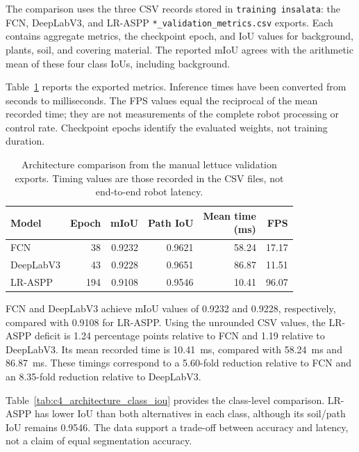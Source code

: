 The comparison uses the three CSV records stored in
\texttt{training insalata}: the FCN, DeepLabV3, and LR-ASPP
\texttt{*\_\allowbreak validation\_\allowbreak metrics.csv} exports.
Each contains aggregate metrics, the checkpoint epoch, and IoU values
for background, plants, soil, and covering material. The reported mIoU
agrees with the arithmetic mean of these four class IoUs, including
background.

Table~\ref{tab:c4_architecture_results} reports the exported metrics.
Inference times have been converted from seconds to milliseconds.
The FPS values equal the reciprocal of the mean recorded time; they
are not measurements of the complete robot processing or control rate.
Checkpoint epochs identify the evaluated weights, not training duration.

\begin{table}[htbp]
    \centering
    \small
    \caption{Architecture comparison from the manual lettuce validation
    exports. Timing values are those recorded in the CSV files, not
    end-to-end robot latency.}
    \label{tab:c4_architecture_results}
    \begin{tabular}{@{}l r r r r r@{}}
        \toprule
        Model & Epoch & mIoU & Path IoU &
        \shortstack{Mean time\\(ms)} & FPS \\
        \midrule
        FCN & 38 & 0.9232 & 0.9621 & 58.24 & 17.17 \\
        DeepLabV3 & 43 & 0.9228 & 0.9651 & 86.87 & 11.51 \\
        LR-ASPP & 194 & 0.9108 & 0.9546 & 10.41 & 96.07 \\
        \bottomrule
    \end{tabular}
\end{table}

FCN and DeepLabV3 achieve mIoU values of 0.9232 and 0.9228, respectively,
compared with 0.9108 for LR-ASPP. Using the unrounded CSV values, the
LR-ASPP deficit is 1.24 percentage points relative to FCN and 1.19
relative to DeepLabV3. Its mean recorded time is 10.41~ms, compared
with 58.24~ms and 86.87~ms. These timings correspond to a 5.60-fold
reduction relative to FCN and an 8.35-fold reduction relative to
DeepLabV3.

Table~\ref{tab:c4_architecture_class_iou} provides the class-level
comparison. LR-ASPP has lower IoU than both alternatives in each class,
although its soil/path IoU remains 0.9546. The data support a trade-off
between accuracy and latency, not a claim of equal segmentation accuracy.

